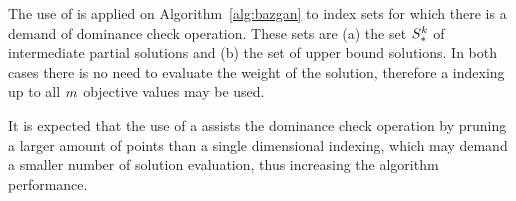 The use of \kdtree{} is applied on Algorithm~\ref{alg:bazgan}
to index sets for which there is a demand of dominance check operation.
These sets are (a) the set $S_*^k$ of intermediate partial solutions
and (b) the set of upper bound solutions.
In both cases there is no need to evaluate the weight of the solution,
therefore a \kdtree{} indexing up to all $m$ objective values may be used.

It is expected that the use of a \kdtree{}
assists the dominance check operation by
pruning a larger amount of points than a single dimensional indexing,
which may demand a smaller number of solution evaluation,
thus increasing the algorithm performance.
